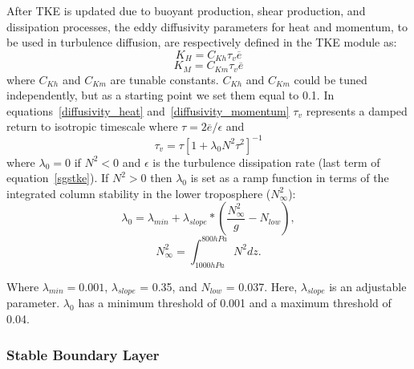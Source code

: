 \documentclass[12pt,titlepage]{article}
\numberwithin{equation}{section}
\begin{document}
After TKE is updated due to buoyant production, shear production, and dissipation processes, the eddy diffusivity parameters for heat and momentum, to be used in turbulence diffusion, are respectively defined in the TKE module as:
\begin{equation}
  K_{H}=C_{Kh} \tau_{v} \overline{e}
  \label{diffusivity_heat}
\end{equation}
%
\begin{equation}
  K_{M}=C_{Km} \tau_{v} \overline{e}
  \label{diffusivity_momentum}
\end{equation}
%
where $C_{Kh}$ and $C_{Km}$ are tunable constants.  $C_{Kh}$ and $C_{Km}$ could be tuned independently, but as a starting point we set them equal to 0.1.  In equations~\ref{diffusivity_heat} and~\ref{diffusivity_momentum} $\tau_{v}$ represents a damped return to isotropic timescale where $\tau=2\overline{e}/\epsilon$ and
%
\begin{equation}
  \tau_{v}=\tau\left[1+\lambda_{0}N^{2}\tau^{2}\right]^{-1}
  \label{tauv}
\end{equation}
% 
where $\lambda_{0}=0$ if $N^{2} < 0$ and $\epsilon$ is the turbulence dissipation rate (last term of equation~\ref{sgstke}).  If $N^{2} > 0$ then $\lambda_{0}$ is set as a ramp function in terms of the integrated column stability in the lower troposphere ($N_{\infty}^{2}$): 
%
\begin{equation}
  \lambda_{0} = \lambda_{min} + \lambda_{slope}*(\frac{N_{\infty}^{2}}{g} - N_{low}), 
  \label{lambda0}
\end{equation}
% 
%
\begin{equation}
  N_{\infty}^{2} = \int_{1000 hPa}^{800 hPa} N^{2} dz . 
  \label{int_N}
\end{equation}
%

Where $\lambda_{min} = 0.001$, $\lambda_{slope}$ = 0.35, and $N_{low}$ = 0.037.  Here, $\lambda_{slope}$ is an adjustable parameter.  $\lambda_{0}$ has a minimum threshold of 0.001 and a maximum threshold of 0.04.   

\subsubsection{Stable Boundary Layer}
\end{document}
